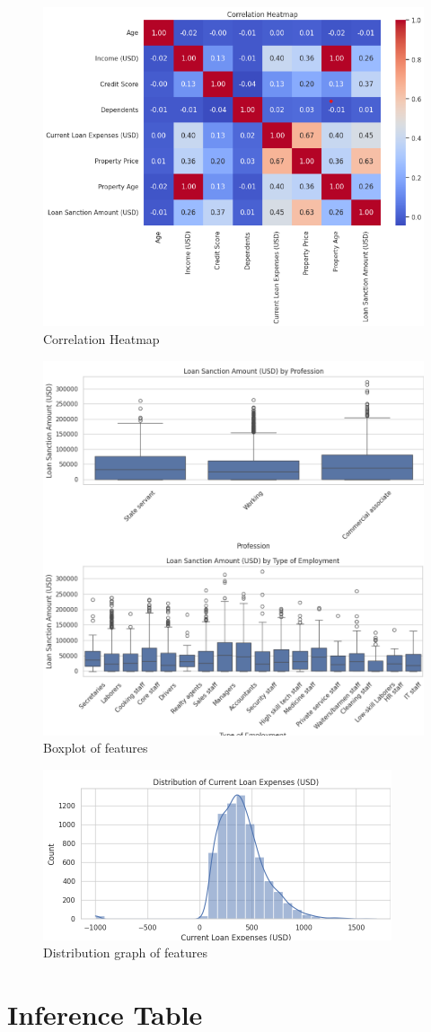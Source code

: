 \documentclass[12pt]{article}
\begin{document}
\begin{figure}[H]
  \centering
  \includegraphics[width=0.5\linewidth]{ima1.png}
  \caption{Correlation Heatmap}
  \label{fig:metrics}
\end{figure}

\begin{figure}[H]
  \centering
  \includegraphics[width=0.5\linewidth]{ima2.png}
  \caption{ Boxplot of features }
  \label{fig:dist}
\end{figure}

\begin{figure}[H]
  \centering
  \includegraphics[width=0.5\linewidth]{ima3.png}
  \caption{ Distribution graph of features }
  \label{fig:dist}
\end{figure}
\section*{Inference Table}
\end{document}
